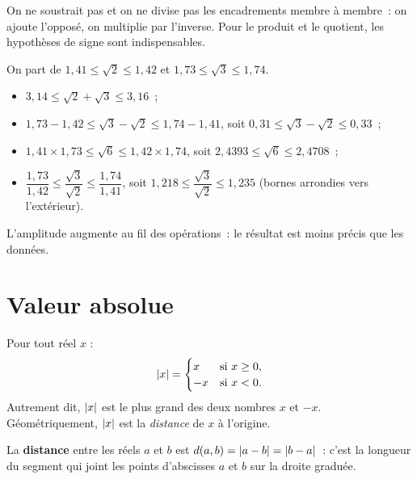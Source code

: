 \begin{attention}
On ne soustrait pas et on ne divise pas les encadrements \og membre \`a membre\fg{}~:
on ajoute l'oppos\'e, on multiplie par l'inverse. Pour le produit et le quotient,
les hypoth\`eses de signe sont indispensables.
\end{attention}

\begin{ex}
On part de $1{,}41\leq\sqrt2\leq1{,}42$ et $1{,}73\leq\sqrt3\leq1{,}74$.
\begin{itemize}
  \item $3{,}14\leq\sqrt2+\sqrt3\leq3{,}16$~;
  \item $1{,}73-1{,}42\leq\sqrt3-\sqrt2\leq1{,}74-1{,}41$, soit $0{,}31\leq\sqrt3-\sqrt2\leq0{,}33$~;
  \item $1{,}41\times1{,}73\leq\sqrt6\leq1{,}42\times1{,}74$, soit $2{,}4393\leq\sqrt6\leq2{,}4708$~;
  \item $\dfrac{1{,}73}{1{,}42}\leq\dfrac{\sqrt3}{\sqrt2}\leq\dfrac{1{,}74}{1{,}41}$, soit
        $1{,}218\leq\dfrac{\sqrt3}{\sqrt2}\leq1{,}235$ (bornes arrondies vers l'ext\'erieur).
\end{itemize}
L'amplitude augmente au fil des op\'erations~: le r\'esultat est moins pr\'ecis que les donn\'ees.
\end{ex}

\section{Valeur absolue}

\begin{defn}
Pour tout r\'eel $x$ :
$$\left|x\right| = \begin{cases} x & \text{si } x \geq 0, \\ -x & \text{si } x < 0. \end{cases}$$
Autrement dit, $\left|x\right|$ est le plus grand des deux nombres $x$ et $-x$.
G\'eom\'etriquement, $\left|x\right|$ est la \emph{distance} de $x$ \`a l'origine.
\end{defn}

\begin{defn}
La \textbf{distance} entre les r\'eels $a$ et $b$ est $d(a,b)=\left|a-b\right|=\left|b-a\right|$~:
c'est la longueur du segment qui joint les points d'abscisses $a$ et $b$ sur la
droite gradu\'ee.
\end{defn}

